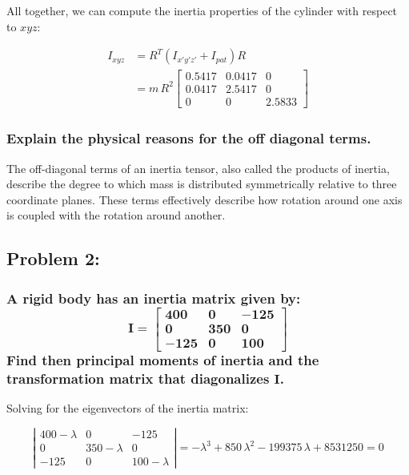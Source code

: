 \documentclass[12pt, letterpaper]{../assignment}
\begin{document}
All together, we can compute the inertia properties of the cylinder with respect to $xyz$:

\begin{answer}
\begin{equation*}
\begin{aligned}
    I_{xyz} &= R^T \left(I_{x'y'z'}+I_{pat}\right) R \\
    &= m\,R^2\left[\begin{array}{ccc} 0.5417 & 0.0417 & 0\\
    0.0417 & 2.5417 & 0\\
    0 & 0 & 2.5833 \end{array}\right]
\end{aligned}
\end{equation*}
\end{answer}

\subsubsection*{Explain the physical reasons for the off diagonal terms.}

\begin{answer}
The off-diagonal terms of an inertia tensor,
also called the products of inertia,
describe the degree to which mass is distributed symmetrically relative to three coordinate planes.
These terms effectively describe how rotation around one axis is coupled with the rotation around another.
\end{answer}

\subsection*{Problem 2:}
\subsubsection*{A rigid body has an inertia matrix given by:
$$ \bm{I = } \left[\begin{array}{ccc}
    \bm{400} & \bm{0} & \bm{-125} \\
    \bm{0} & \bm{350} & \bm{0} \\
    \bm{-125} & \bm{0} & \bm{100}
\end{array}\right] $$
Find then principal moments of inertia and the transformation matrix that diagonalizes $\bm{I}$.}

Solving for the eigenvectors of the inertia matrix:

$$ \left|\begin{array}{ccc} 400-\lambda  & 0 & -125\\ 0 & 350-\lambda  & 0\\ -125 & 0 & 100-\lambda  \end{array}\right| = -\lambda ^3+850\,\lambda ^2-199375\,\lambda +8531250 = 0 $$
\end{document}
